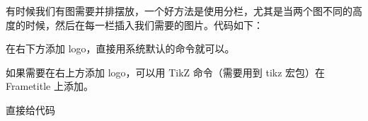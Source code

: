 
有时候我们有图需要并排摆放，一个好方法是使用分栏，尤其是当两个图不同的高度的时候，然后在每一栏插入我们需要的图片。代码如下：

\begin{texinlist}
\end{texinlist}



在右下方添加 logo，直接用系统默认的命令就可以。

\begin{texinlist}
\end{texinlist}

如果需要在右上方添加 logo，可以用 TikZ 命令（需要用到 tikz 宏包）在
Frametitle 上添加。

\begin{texinlist}
\end{texinlist}



直接给代码

\begin{texinlist}
\newenvironment{question}
{\begin{frame}[environment=question,fragile]
 \begin{theorem}
}
{\end{theorem}
 \end{frame}
}
\end{texinlist}




